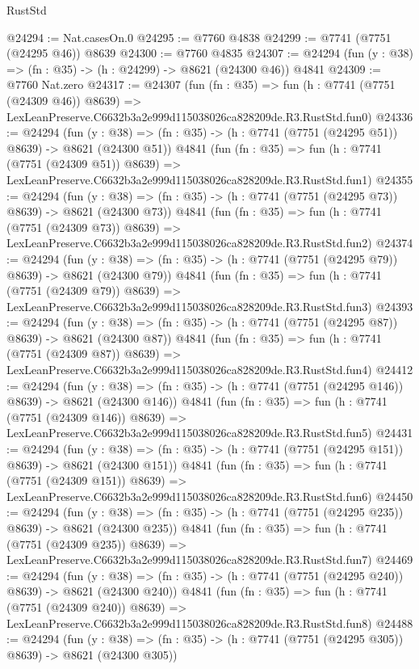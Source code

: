 \begin{lexlean}{RustStd}
\begin{coremodule}
@24294 := Nat.casesOn.{0}
@24295 := @7760 @4838
@24299 := @7741 (@7751 (@24295 @46)) @8639
@24300 := @7760 @4835
@24307 := @24294 (fun (y : @38) => (fn : @35) -> (h : @24299) -> @8621 (@24300 @46)) @4841
@24309 := @7760 Nat.zero
@24317 := @24307
    (fun (fn : @35) =>
    fun (h : @7741 (@7751 (@24309 @46)) @8639) =>
    LexLeanPreserve.C6632b3a2e999d115038026ca828209de.R3.RustStd.fun0)
@24336 := @24294
    (fun (y : @38) => (fn : @35) -> (h : @7741 (@7751 (@24295 @51)) @8639) -> @8621 (@24300 @51))
    @4841
    (fun (fn : @35) =>
    fun (h : @7741 (@7751 (@24309 @51)) @8639) =>
    LexLeanPreserve.C6632b3a2e999d115038026ca828209de.R3.RustStd.fun1)
@24355 := @24294
    (fun (y : @38) => (fn : @35) -> (h : @7741 (@7751 (@24295 @73)) @8639) -> @8621 (@24300 @73))
    @4841
    (fun (fn : @35) =>
    fun (h : @7741 (@7751 (@24309 @73)) @8639) =>
    LexLeanPreserve.C6632b3a2e999d115038026ca828209de.R3.RustStd.fun2)
@24374 := @24294
    (fun (y : @38) => (fn : @35) -> (h : @7741 (@7751 (@24295 @79)) @8639) -> @8621 (@24300 @79))
    @4841
    (fun (fn : @35) =>
    fun (h : @7741 (@7751 (@24309 @79)) @8639) =>
    LexLeanPreserve.C6632b3a2e999d115038026ca828209de.R3.RustStd.fun3)
@24393 := @24294
    (fun (y : @38) => (fn : @35) -> (h : @7741 (@7751 (@24295 @87)) @8639) -> @8621 (@24300 @87))
    @4841
    (fun (fn : @35) =>
    fun (h : @7741 (@7751 (@24309 @87)) @8639) =>
    LexLeanPreserve.C6632b3a2e999d115038026ca828209de.R3.RustStd.fun4)
@24412 := @24294
    (fun (y : @38) => (fn : @35) -> (h : @7741 (@7751 (@24295 @146)) @8639) -> @8621 (@24300 @146))
    @4841
    (fun (fn : @35) =>
    fun (h : @7741 (@7751 (@24309 @146)) @8639) =>
    LexLeanPreserve.C6632b3a2e999d115038026ca828209de.R3.RustStd.fun5)
@24431 := @24294
    (fun (y : @38) => (fn : @35) -> (h : @7741 (@7751 (@24295 @151)) @8639) -> @8621 (@24300 @151))
    @4841
    (fun (fn : @35) =>
    fun (h : @7741 (@7751 (@24309 @151)) @8639) =>
    LexLeanPreserve.C6632b3a2e999d115038026ca828209de.R3.RustStd.fun6)
@24450 := @24294
    (fun (y : @38) => (fn : @35) -> (h : @7741 (@7751 (@24295 @235)) @8639) -> @8621 (@24300 @235))
    @4841
    (fun (fn : @35) =>
    fun (h : @7741 (@7751 (@24309 @235)) @8639) =>
    LexLeanPreserve.C6632b3a2e999d115038026ca828209de.R3.RustStd.fun7)
@24469 := @24294
    (fun (y : @38) => (fn : @35) -> (h : @7741 (@7751 (@24295 @240)) @8639) -> @8621 (@24300 @240))
    @4841
    (fun (fn : @35) =>
    fun (h : @7741 (@7751 (@24309 @240)) @8639) =>
    LexLeanPreserve.C6632b3a2e999d115038026ca828209de.R3.RustStd.fun8)
@24488 := @24294
    (fun (y : @38) => (fn : @35) -> (h : @7741 (@7751 (@24295 @305)) @8639) -> @8621 (@24300 @305))

\end{coremodule}
\end{lexlean}
